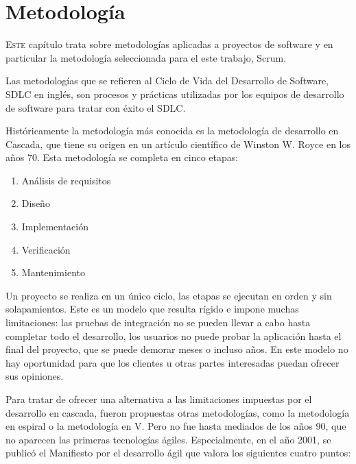

\chapter{Metodología}
\label{chap:metodologia}

\lettrine{E}{ste} capítulo trata sobre metodologías aplicadas a proyectos de software y en particular la metodología seleccionada para el este trabajo, Scrum.

Las metodologías que se refieren al Ciclo de Vida del Desarrollo de Software, SDLC en inglés, son procesos y prácticas utilizadas por los equipos de desarrollo de software para tratar con éxito el SDLC.

Históricamente la metodología más conocida es la metodología de desarrollo en Cascada, que tiene su origen en un artículo científico de Winston W. Royce en los años 70. Esta metodología se completa en cinco etapas:

\begin{enumerate}
    \item Análisis de requisitos
    \item Diseño
    \item Implementación
    \item Verificación
    \item Mantenimiento
\end{enumerate}

Un proyecto se realiza en un único ciclo,  las etapas se ejecutan en orden y sin solapamientos. Este es un modelo que resulta rígido e impone muchas limitaciones: las pruebas de integración no se pueden llevar a cabo hasta completar todo el desarrollo, los usuarios no puede probar la aplicación hasta el final del proyecto, que se puede demorar meses o incluso años. En este modelo no hay oportunidad para que los clientes u otras partes interesadas puedan ofrecer sus opiniones.

Para tratar de ofrecer una alternativa a las limitaciones impuestas por el desarrollo en cascada, fueron propuestas otras metodologías, como la metodología en espiral o la metodología en V. Pero no fue hasta mediados de los años 90, que no aparecen las primeras tecnologías ágiles. Especialmente, en el año 2001, se publicó el Manifiesto por el desarrollo ágil que valora los siguientes cuatro puntos:

